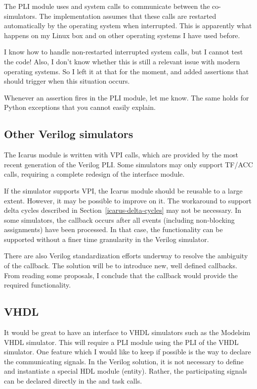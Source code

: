 The PLI module uses  and  system calls to
communicate between the co-simulators. The implementation assumes that
these calls are restarted automatically by the operating system when
interrupted. This is apparently what happens on my Linux box and on
other operating systems I have used before.

I know how to handle non-restarted interrupted system calls, but I
cannot test the code! Also, I don't know whether this is still a
relevant issue with modern operating systems. So I left it
at that for the moment, and added assertions that should trigger
when this situation occurs.

Whenever an assertion fires in the PLI module, let me
know. The same holds for Python exceptions that you cannot
easily explain.

\subsection{Other Verilog simulators}

The Icarus module is written with VPI calls, which are provided by the
most recent generation of the Verilog PLI. Some simulators may only
support TF/ACC calls, requiring a complete redesign of the interface
module.

If the simulator supports VPI, the Icarus module should be reusable to
a large extent. However, it may be possible to improve on it.  The
workaround to support delta cycles described in
Section~\ref{icarus-delta-cycles} may not be necessary. In some
simulators, the  callback occurs after all
events (including non-blocking assignments) have been processed. In
that case, the functionality can be supported without a finer time
granularity in the Verilog simulator.

There are also Verilog standardization efforts underway to resolve the
ambiguity of the  callback. The solution will be
to introduce new, well defined callbacks. From reading some proposals,
I conclude that the  callback would provide the
required functionality.

\subsection{VHDL}

It would be great to have an interface to VHDL simulators such as the
Modelsim VHDL simulator. This will require a PLI module using the
PLI of the VHDL simulator. One feature which I would
like to keep if possible is the way to declare the communicating
signals.  In the Verilog solution, it is not necessary to define and
instantiate a special HDL module (entity). Rather, the participating
signals can be declared directly in the  and
 task calls.

